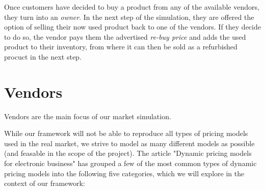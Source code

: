 Once customers have decided to buy a product from any of the available vendors, they turn into an \emph{owner}. In the next step of the simulation, they are offered the option of selling their now used product back to one of the vendors. If they decide to do so, the vendor pays them the advertised \emph{re-buy price} and adds the used product to their inventory, from where it can then be sold as a refurbished procuct in the next step.

\section{Vendors} \label{sec:ExplainVendors}

Vendors are the main focus of our market simulation.

While our framework will not be able to reproduce all types of pricing models used in the real market, we strive to model as many different models as possible (and feasable in the scope of the project). The article "Dynamic pricing models for electronic business" \cite{dynamicPricingModels} has grouped a few of the most common types of dynamic pricing models into the following five categories, which we will explore in the context of our framework:

